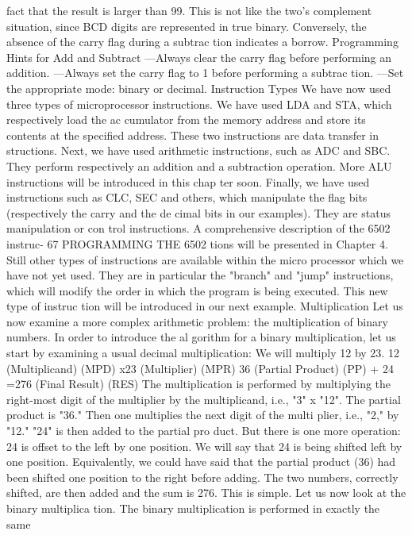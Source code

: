 \documentclass{book}
\begin{document}
fact that the result is larger than 99. This is not like the two's
complement situation, since BCD digits are represented in true
binary. Conversely, the absence of the carry flag during a subtrac
tion indicates a borrow.
Programming Hints for Add and Subtract
—Always clear the carry flag before performing an addition.
—Always set the carry flag to 1 before performing a subtrac
tion.
—Set the appropriate mode: binary or decimal.
Instruction Types
We have now used three types of microprocessor instructions.
We have used LDA and STA, which respectively load the ac
cumulator from the memory address and store its contents at the
specified address. These two instructions are data transfer in
structions.
Next, we have used arithmetic instructions, such as ADC and
SBC. They perform respectively an addition and a subtraction
operation. More ALU instructions will be introduced in this chap
ter soon.
Finally, we have used instructions such as CLC, SEC and others,
which manipulate the flag bits (respectively the carry and the de
cimal bits in our examples). They are status manipulation or con
trol instructions. A comprehensive description of the 6502 instruc-
67
PROGRAMMING THE 6502
tions will be presented in Chapter 4.
Still other types of instructions are available within the micro
processor which we have not yet used. They are in particular
the "branch" and "jump" instructions, which will modify the order
in which the program is being executed. This new type of instruc
tion will be introduced in our next example.
Multiplication
Let us now examine a more complex arithmetic problem: the
multiplication of binary numbers. In order to introduce the al
gorithm for a binary multiplication, let us start by examining a
usual decimal multiplication: We will multiply 12 by 23.
12 (Multiplicand) (MPD)
x23 (Multiplier) (MPR)
36 (Partial Product) (PP)
+ 24
=276 (Final Result) (RES)
The multiplication is performed by multiplying the right-most digit
of the multiplier by the multiplicand, i.e., "3" x "12". The partial
product is "36." Then one multiplies the next digit of the multi
plier, i.e., "2," by "12." "24" is then added to the partial pro
duct.
But there is one more operation: 24 is offset to the left by one
position. We will say that 24 is being shifted left by one position.
Equivalently, we could have said that the partial product (36) had
been shifted one position to the right before adding.
The two numbers, correctly shifted, are then added and the sum
is 276. This is simple. Let us now look at the binary multiplica
tion. The binary multiplication is performed in exactly the same
\end{document}

